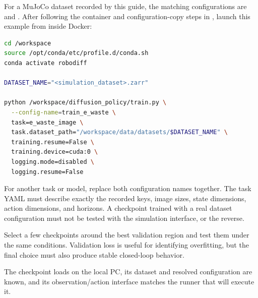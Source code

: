 For a MuJoCo dataset recorded by this guide, the matching configurations are
 and . After following the
container and configuration-copy steps in , launch
this example from inside Docker:

\begin{lstlisting}[language=bash]
cd /workspace
source /opt/conda/etc/profile.d/conda.sh
conda activate robodiff

DATASET_NAME="<simulation_dataset>.zarr"

python /workspace/diffusion_policy/train.py \
  --config-name=train_e_waste \
  task=e_waste_image \
  task.dataset_path="/workspace/data/datasets/$DATASET_NAME" \
  training.resume=False \
  training.device=cuda:0 \
  logging.mode=disabled \
  logging.resume=False
\end{lstlisting}

For another task or model, replace both configuration names together. The task
YAML must describe exactly the recorded keys, image sizes, state
dimensions, action dimensions, and horizons. A checkpoint trained with a real
dataset configuration must not be tested with the simulation interface, or the
reverse.

Select a few checkpoints around the best validation region and test them under
the same conditions. Validation loss is useful for identifying overfitting, but
the final choice must also produce stable closed-loop behavior.

\begin{checkpointbox}[Checkpoint ready]
The checkpoint loads on the local PC, its dataset and resolved configuration
are known, and its observation/action interface matches the runner that will
execute it.
\end{checkpointbox}
